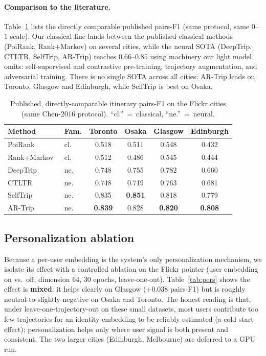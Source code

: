 \paragraph{Comparison to the literature.} Table~\ref{tab:flickr-pub} lists the directly
comparable published pairs-F1 (same protocol, same $0$--$1$ scale). Our classical line lands
between the published classical methods (PoiRank, Rank+Markov) on several cities, while the
neural SOTA (DeepTrip, CTLTR, SelfTrip, AR-Trip) reaches $0.66$--$0.85$ using machinery our
light model omits: self-supervised and contrastive pre-training, trajectory augmentation, and
adversarial training. There is no single SOTA across all cities: AR-Trip leads on
Toronto, Glasgow and Edinburgh, while SelfTrip is best on Osaka.

\begin{table}[ht]
\centering
\caption{Published, directly-comparable itinerary pairs-F1 on the Flickr cities (same Chen-2016
protocol). ``cl.''~=~classical, ``ne.''~=~neural.}
\label{tab:flickr-pub}
\begin{tabular}{llcccc}
\toprule
Method & Fam. & Toronto & Osaka & Glasgow & Edinburgh \\
\midrule
PoiRank~\cite{chen2016learning}      & cl. & 0.518 & 0.511 & 0.548 & 0.432 \\
Rank+Markov~\cite{chen2016learning}  & cl. & 0.512 & 0.486 & 0.545 & 0.444 \\
DeepTrip~\cite{gao2019deeptrip}      & ne. & 0.748 & 0.755 & 0.782 & 0.660 \\
CTLTR~\cite{zhou2021ctltr}           & ne. & 0.748 & 0.719 & 0.763 & 0.681 \\
SelfTrip~\cite{gao2022selftrip}      & ne. & 0.835 & \textbf{0.851} & 0.818 & 0.779 \\
AR-Trip~\cite{shu2024artrip}         & ne. & \textbf{0.839} & 0.828 & \textbf{0.820} & \textbf{0.808} \\
\bottomrule
\end{tabular}
\end{table}



\subsection{Personalization ablation}
\label{sec:sol-results-pers}

Because a per-user embedding is the system's only personalization mechanism, we isolate its
effect with a controlled ablation on the Flickr pointer (user embedding on vs.\ off; dimension
64, 30 epochs, leave-one-out). Table~\ref{tab:pers} shows the effect is \textbf{mixed}: it helps
clearly on Glasgow ($+0.038$ pairs-F1) but is roughly neutral-to-slightly-negative on Osaka and
Toronto. The honest reading is that, under leave-one-trajectory-out on these small datasets, most
users contribute too few trajectories for an identity embedding to be reliably estimated
(a cold-start effect); personalization helps only where user signal is both present and
consistent. The two larger cities (Edinburgh, Melbourne) are deferred to a GPU run.

